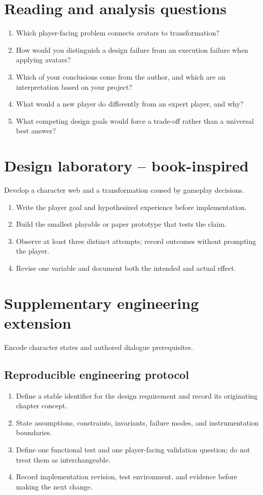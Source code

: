 \documentclass[11pt]{article}
\begin{document}
\section{Reading and analysis questions}
\begin{enumerate}
\item Which player-facing problem connects avatars to transformation?
\item How would you distinguish a design failure from an execution failure when applying avatars?
\item Which of your conclusions come from the author, and which are an interpretation based on your project?
\item What would a new player do differently from an expert player, and why?
\item What competing design goals would force a trade-off rather than a universal best answer?
\end{enumerate}

\section{Design laboratory -- book-inspired}
Develop a character web and a transformation caused by gameplay decisions.

\begin{enumerate}
\item Write the player goal and hypothesized experience before implementation.
\item Build the smallest playable or paper prototype that tests the claim.
\item Observe at least three distinct attempts; record outcomes without prompting the player.
\item Revise one variable and document both the intended and actual effect.
\end{enumerate}

\section{Supplementary engineering extension}
Encode character states and authored dialogue prerequisites.


\subsection{Reproducible engineering protocol}
\begin{enumerate}
\item Define a stable identifier for the design requirement and record its originating chapter concept.
\item State assumptions, constraints, invariants, failure modes, and instrumentation boundaries.
\item Define one functional test and one player-facing validation question; do not treat them as interchangeable.
\item Record implementation revision, test environment, and evidence before making the next change.
\end{enumerate}
\end{document}
